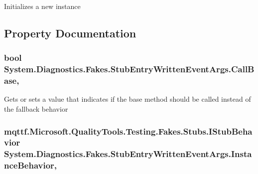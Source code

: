 Initializes a new instance



\subsection{Property Documentation}
\hypertarget{class_system_1_1_diagnostics_1_1_fakes_1_1_stub_entry_written_event_args_a942e2dafd09f53cbb51842c56a7d10df}{
\subsubsection[{Call\-Base}]{\setlength{\rightskip}{0pt plus 5cm}bool System.\-Diagnostics.\-Fakes.\-Stub\-Entry\-Written\-Event\-Args.\-Call\-Base\hspace{0.3cm}{\ttfamily [get]}, {\ttfamily [set]}}}\label{class_system_1_1_diagnostics_1_1_fakes_1_1_stub_entry_written_event_args_a942e2dafd09f53cbb51842c56a7d10df}


Gets or sets a value that indicates if the base method should be called instead of the fallback behavior

\hypertarget{class_system_1_1_diagnostics_1_1_fakes_1_1_stub_entry_written_event_args_aacbfb10d03065a4371ca759840bfdb0f}{
\subsubsection[{Instance\-Behavior}]{\setlength{\rightskip}{0pt plus 5cm}mqttf.\-Microsoft.\-Quality\-Tools.\-Testing.\-Fakes.\-Stubs.\-I\-Stub\-Behavior System.\-Diagnostics.\-Fakes.\-Stub\-Entry\-Written\-Event\-Args.\-Instance\-Behavior\hspace{0.3cm}{\ttfamily [get]}, {\ttfamily [set]}}}\label{class_system_1_1_diagnostics_1_1_fakes_1_1_stub_entry_written_event_args_aacbfb10d03065a4371ca759840bfdb0f}


